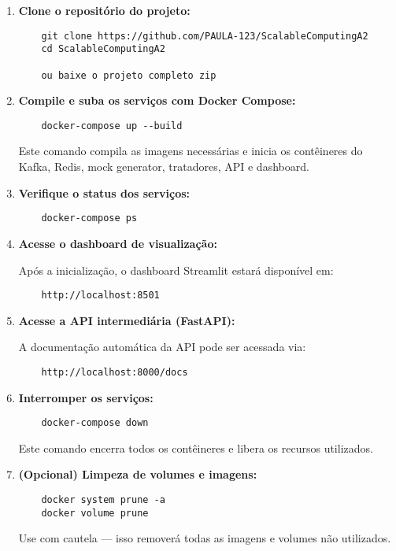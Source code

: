 \documentclass[a4paper,12pt]{article}
\begin{document}
\begin{enumerate}
    \item \textbf{Clone o repositório do projeto:}
    \begin{verbatim}
    git clone https://github.com/PAULA-123/ScalableComputingA2
    cd ScalableComputingA2

    ou baixe o projeto completo zip
    \end{verbatim}

    \item \textbf{Compile e suba os serviços com Docker Compose:}
    \begin{verbatim}
    docker-compose up --build
    \end{verbatim}

    Este comando compila as imagens necessárias e inicia os contêineres do Kafka, Redis, mock generator, tratadores, API e dashboard.

    \item \textbf{Verifique o status dos serviços:}
    \begin{verbatim}
    docker-compose ps
    \end{verbatim}

    \item \textbf{Acesse o dashboard de visualização:}

    Após a inicialização, o dashboard Streamlit estará disponível em:
    \begin{verbatim}
    http://localhost:8501
    \end{verbatim}

    \item \textbf{Acesse a API intermediária (FastAPI):}

    A documentação automática da API pode ser acessada via:
    \begin{verbatim}
    http://localhost:8000/docs
    \end{verbatim}

    \item \textbf{Interromper os serviços:}
    \begin{verbatim}
    docker-compose down
    \end{verbatim}

    Este comando encerra todos os contêineres e libera os recursos utilizados.

    \item \textbf{(Opcional) Limpeza de volumes e imagens:}
    \begin{verbatim}
    docker system prune -a
    docker volume prune
    \end{verbatim}
    Use com cautela — isso removerá todas as imagens e volumes não utilizados.
\end{enumerate}
\end{document}
